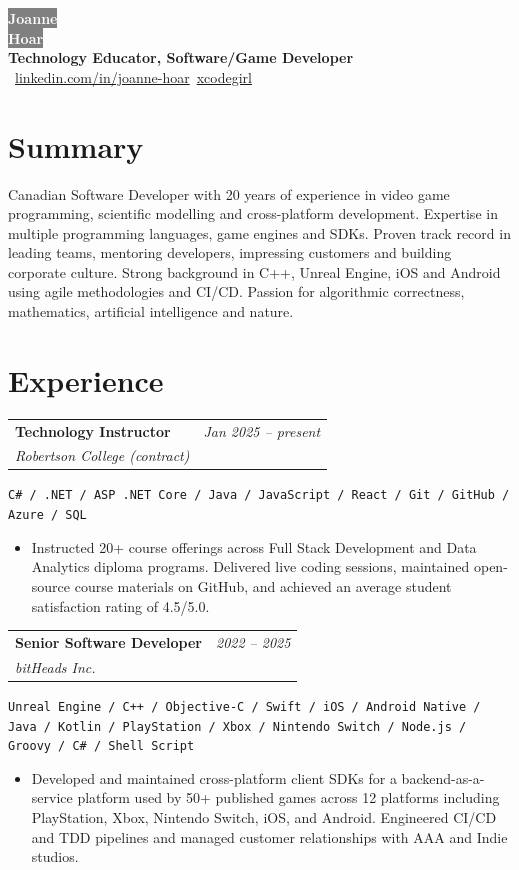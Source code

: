 \documentclass[10pt]{article}
\makeatletter
\newcommand{\tech}[1]{\textcolor{secondary}{\textbf{#1}}}
\newcommand{\experience}[4]{%
  \vspace{4pt}
  \begin{tabular*}{\textwidth}{@{}l@{\extracolsep{\fill}}r@{}}
    \textbf{#1} & \textit{#2} \\
    \textit{\small#3} & \textit{\small#4}
  \end{tabular*}
  \vspace{-4pt}
}
\makeatother
\begin{document}
\begin{center}
\colorbox{gray}{\HUGE\textcolor{white}{\textbf{Joanne}}} \\[2pt]
\colorbox{gray}{\HUGE\textcolor{white}{\textbf{Hoar}}} \\[6pt]
    {\Large \tech{Technology Educator, Software/Game Developer}} \\[6pt]
    ~\href{https://linkedin.com/in/joanne-hoar/}{linkedin.com/in/joanne-hoar}\hfill {}~\href{https://github.com/xcodegirl}{xcodegirl}
\end{center}

\section*{Summary}

Canadian Software Developer with 20 years of experience in video game programming, scientific modelling and cross-platform development. Expertise in multiple programming languages, game engines and SDKs. Proven track record in leading teams, mentoring developers, impressing customers and building corporate culture. Strong background in C++, Unreal Engine, iOS and Android using agile methodologies and CI/CD. Passion for algorithmic correctness, mathematics, artificial intelligence and nature.

\section*{Experience}

\experience{Technology Instructor}{Jan 2025 -- present}{Robertson College (contract)}{}
\hspace{0.5cm}\texttt{C\# / .NET / ASP .NET Core / Java / JavaScript / React / Git / GitHub / Azure / SQL}
\begin{itemize}
    \item Instructed 20+ course offerings across Full Stack Development and Data Analytics diploma programs. Delivered live coding sessions, maintained open-source course materials on GitHub, and achieved an average student satisfaction rating of 4.5/5.0.
\end{itemize}

\experience{Senior Software Developer}{2022 -- 2025}{bitHeads Inc.}{}
\hspace{0.5cm}\texttt{Unreal Engine / C++ / Objective-C / Swift / iOS / Android Native / Java / Kotlin / PlayStation / Xbox / Nintendo Switch / Node.js / Groovy / C\# / Shell Script}
\begin{itemize}
    \item Developed and maintained cross-platform client SDKs for a backend-as-a-service platform used by 50+ published games across 12 platforms including PlayStation, Xbox, Nintendo Switch, iOS, and Android. Engineered CI/CD and TDD pipelines and managed customer relationships with AAA and Indie studios.
\end{itemize}
\end{document}
